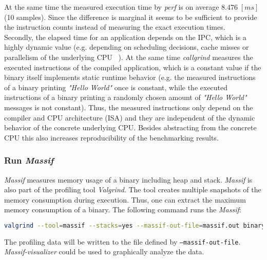 At the same time the measured execution time by \textit{perf} is on average $8.476\;[ms]$ (10 samples). Since the difference is marginal it seems to be sufficient to provide the instruction counts instead of measuring the exact execution times.
\\
Secondly, the elapsed time for an application depends on the \gls{IPC}, which is a highly dynamic value (e.g. depending on scheduling decisions, cache misses or parallelism of the underlying \gls{CPU} ~\parencite{alameldeen2006ipc}). At the same time \textit{callgrind} measures the executed instructions of the compiled application, which is a constant value if the binary itself implements static runtime behavior (e.g. the measured instructions of a binary printing \textit{"Hello World"} once is constant, while the executed instructions of a binary printing a randomly chosen amount of \textit{"Hello World"} messages is not constant). Thus, the measured instructions only depend on the compiler and \gls{CPU} architecture (\gls{ISA}) and they are independent of the dynamic behavior of the concrete underlying \gls{CPU}. Besides abstracting from the concrete \gls{CPU} this also increases reproducibility of the benchmarking results.

\subsubsection{Run \textit{Massif}}
\textit{Massif} measures memory usage of a binary including heap and stack. \textit{Massif} is also part of the profiling tool \textit{Valgrind}. The tool creates multiple snapshots of the memory consumption during execution. Thus, one can extract the maximum memory consumption of a binary. The following command runs the \textit{Massif}:
\begin{lstlisting}[language=Bash]
valgrind --tool=massif --stacks=yes --massif-out-file=massif.out binary
\end{lstlisting}
The profiling data will be written to the file defined by \texttt{--massif-out-file}. \textit{Massif-visualizer} could be used to graphically analyze the data.

